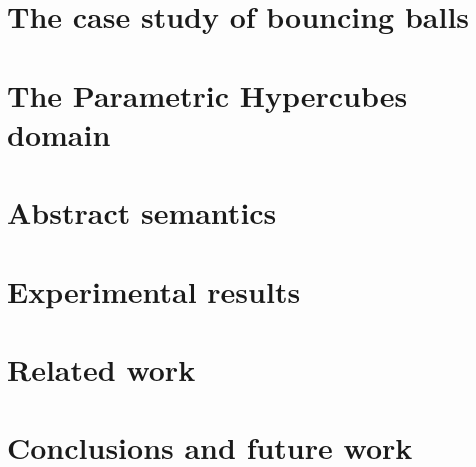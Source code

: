 \documentclass[orivec]{llncs}
\begin{document}
\section{The case study of bouncing balls}
\label{sec:case_study}


\section{The Parametric Hypercubes domain}
\label{sec:hyper_cubes_domain}


\vspace{-10pt}
\section{Abstract semantics}
\vspace{-5pt}
\label{sec:semantics}


\vspace{-10pt}
\section{Experimental results}
\vspace{-5pt}
\label{sec:experimental}


\vspace{-10pt}
\section{Related work}
\vspace{-5pt}
\label{sec:related}


\vspace{-10pt}
\section{Conclusions and future work}
\vspace{-5pt}
\label{sec:conclusions}





\end{document}
